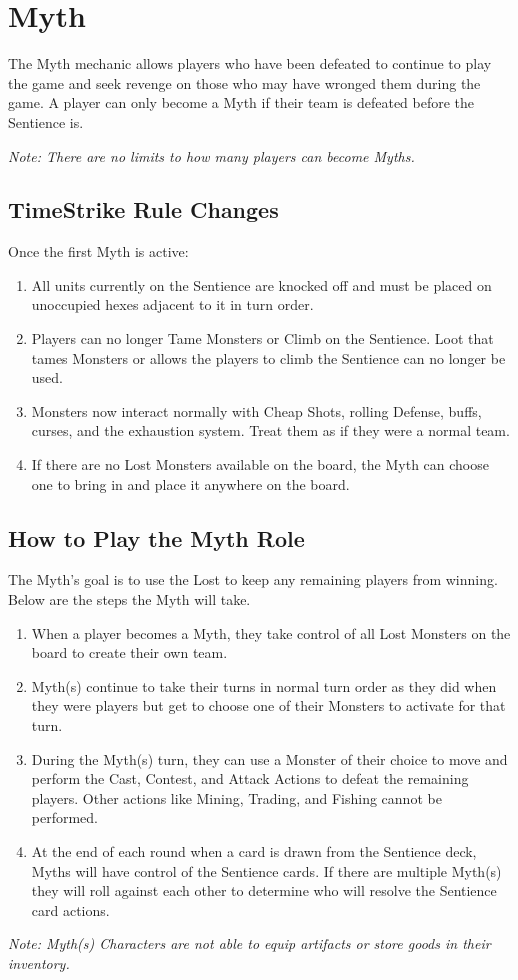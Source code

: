 \documentclass[../main.tex]{subfiles}
\begin{document}
\section{Myth}

The Myth mechanic allows players who have been defeated to continue to play the game and seek revenge on those who may have wronged them during the game. A player can only become a Myth if their team is defeated before the Sentience is.

\textit{Note: There are no limits to how many players can become Myths.}

\subsection{TimeStrike Rule Changes}
Once the first Myth is active: 
\begin{enumerate}
    \item All units currently on the Sentience are knocked off and must be placed on unoccupied hexes adjacent to it in turn order.
    \item Players can no longer Tame Monsters or Climb on the Sentience. Loot that tames Monsters or allows the players to climb the Sentience can no longer be used.
    \item Monsters now interact normally with Cheap Shots, rolling Defense, buffs, curses, and the exhaustion system. Treat them as if they were a normal team.
    \item If there are no Lost Monsters available on the board, the Myth can choose one to bring in and place it anywhere on the board.
\end{enumerate}

\subsection{How to Play the Myth Role}
The Myth’s goal is to use the Lost to keep any remaining players from winning. Below are the steps the Myth will take.
\begin{enumerate}
    \item When a player becomes a Myth, they take control of all Lost Monsters on the board to create their own team.
    \item Myth(s) continue to take their turns in normal turn order as they did when they were players but get to choose one of their Monsters to activate for that turn.
    \item During the Myth(s) turn, they can use a Monster of their choice to move and perform the Cast, Contest, and Attack Actions to defeat the remaining players. Other actions like Mining, Trading, and Fishing cannot be performed.
    \item At the end of each round when a card is drawn from the Sentience deck, Myths will have control of the Sentience cards. If there are multiple Myth(s) they will roll against each other to determine who will resolve the Sentience card actions.
\end{enumerate}

\textit{Note: Myth(s) Characters are not able to equip artifacts or store goods in their inventory.}

\clearpage
\end{document}
